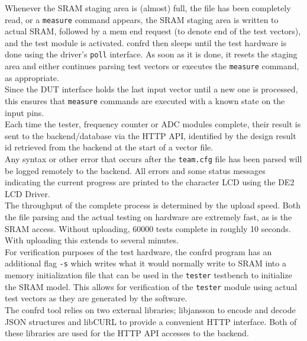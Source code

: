 Whenever the SRAM staging area is (almost) full, the file has been completely read, or
a \texttt{measure} command appears, the SRAM staging area is written to actual SRAM, followed
by a mem end request (to denote end of the test vectors), and the test module is activated.
confrd then sleeps until the test hardware is done using the driver's \texttt{poll} interface.
As soon as it is done, it resets
the staging area and either continues parsing test vectors or executes the \texttt{measure}
command, as appropriate.
\\

Since the DUT interface holds the last input vector until a new one is processed,
this ensures that \texttt{measure} commands are executed with a known state on the input pins.
\\

Each time the tester, frequency counter or ADC modules complete, their result
is sent to the backend/database via the HTTP API, identified by the design result id
retrieved from the backend at the start of a vector file.
\\

Any syntax or other error that occurs after the \texttt{team.cfg} file has been parsed
will be logged remotely to the backend. All errors and some status messages indicating
the current progress are printed to the character LCD using the DE2 LCD Driver.
\\

The throughput of the complete process is determined by the upload speed. Both the
file parsing and the actual testing on hardware are extremely fast, as is the SRAM
access. Without uploading, 60000 tests complete in roughly 10 seconds. With uploading
this extends to several minutes.
\\

For verification purposes of the test hardware, the confrd program has an additional flag
\texttt{-s} which writes what it would normally write to SRAM into a memory initialization
file that can be used in the \texttt{tester} testbench to initialize the SRAM model.
This allows for verification of the \texttt{tester} module using actual test vectors
as they are generated by the software.
\\

The confrd tool relies on two external libraries; libjansson to encode and decode
JSON structures and libCURL to provide a convenient HTTP interface. Both of these libraries
are used for the HTTP API accesses to the backend.


